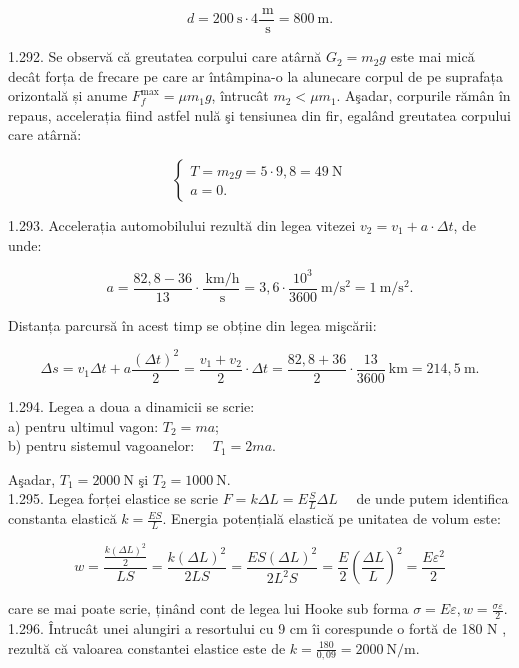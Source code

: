 $$
d=200 \mathrm{~s} \cdot 4 \frac{\mathrm{~m}}{\mathrm{~s}}=800 \mathrm{~m} .
$$

1.292. Se observă că greutatea corpului care atârnă $G_{2}=m_{2} g$ este mai mică decât forța de frecare pe care ar întâmpina-o la alunecare corpul de pe suprafața orizontală și anume $F_{f}^{\max }=\mu m_{1} g$, întrucât $m_{2}<\mu m_{1}$. Aşadar, corpurile rămân în repaus, accelerația fiind astfel nulă şi tensiunea din fir, egalând greutatea corpului care atârnă:

$$
\left\{\begin{array}{l}
T=m_{2} g=5 \cdot 9,8=49 \mathrm{~N} \\
a=0 .
\end{array}\right.
$$

1.293. Accelerația automobilului rezultă din legea vitezei $v_{2}=v_{1}+a \cdot \Delta t$, de unde:

$$
a=\frac{82,8-36}{13} \cdot \frac{\mathrm{~km} / \mathrm{h}}{\mathrm{~s}}=3,6 \cdot \frac{10^{3}}{3600} \mathrm{~m} / \mathrm{s}^{2}=1 \mathrm{~m} / \mathrm{s}^{2} .
$$

Distanța parcursă în acest timp se obține din legea mişcării:

$$
\Delta s=v_{1} \Delta t+a \frac{(\Delta t)^{2}}{2}=\frac{v_{1}+v_{2}}{2} \cdot \Delta t=\frac{82,8+36}{2} \cdot \frac{13}{3600} \mathrm{~km}=214,5 \mathrm{~m} .
$$

1.294. Legea a doua a dinamicii se scrie:\\
a) pentru ultimul vagon: $T_{2}=m a$;\\
b) pentru sistemul vagoanelor: $\quad T_{1}=2 m a$.

Aşadar, $T_{1}=2000 \mathrm{~N}$ şi $T_{2}=1000 \mathrm{~N}$.\\
1.295. Legea forței elastice se scrie $F=k \Delta L=E \frac{S}{L} \Delta L \quad$ de unde putem identifica constanta elastică $k=\frac{E S}{L}$. Energia potențială elastică pe unitatea de volum este:

$$
w=\frac{\frac{k(\Delta L)^{2}}{2}}{L S}=\frac{k(\Delta L)^{2}}{2 L S}=\frac{E S(\Delta L)^{2}}{2 L^{2} S}=\frac{E}{2}\left(\frac{\Delta L}{L}\right)^{2}=\frac{E \varepsilon^{2}}{2}
$$

care se mai poate scrie, ținând cont de legea lui Hooke sub forma $\sigma=E \varepsilon, w=\frac{\sigma \varepsilon}{2}$.\\
1.296. Întrucât unei alungiri a resortului cu 9 cm îi corespunde o fortă de 180 N , rezultă că valoarea constantei elastice este de $k=\frac{180}{0,09}=2000 \mathrm{~N} / \mathrm{m}$.

